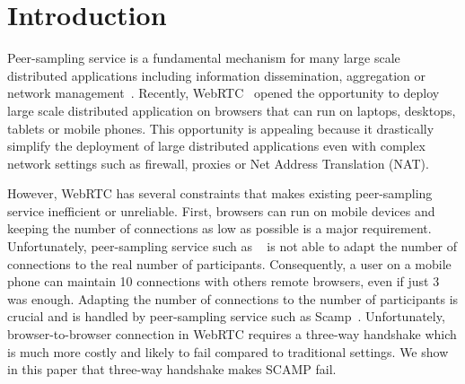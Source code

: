 
\section{Introduction}

Peer-sampling service is a fundamental mechanism for many large scale
distributed applications including information dissemination,
aggregation or network management~\cite{jelasity2007gossip}. Recently,
WebRTC~\cite{webrtc} opened the opportunity to deploy large scale
distributed application on browsers that can run on laptops, desktops,
tablets or mobile phones. This opportunity is appealing because it
drastically simplify the deployment of large distributed applications
even with complex network settings such as firewall, proxies or Net
Address Translation (NAT).


However, WebRTC has several constraints that makes existing
peer-sampling service inefficient or unreliable. First, browsers can
run on mobile devices and keeping the number of connections as low as
possible is a major requirement. Unfortunately, peer-sampling service
such as \CYCLON{}~\cite{ voulgaris2005cyclon} is not able to adapt the
number of connections to the real number of
participants. Consequently, a user on a mobile phone can maintain 10
connections with others remote browsers, even if just 3 was
enough. Adapting the number of connections to the number of
participants is crucial and is handled by peer-sampling service such
as Scamp~\cite{ganesh2003peer}. Unfortunately, browser-to-browser connection
in WebRTC requires a three-way handshake which is much more costly and
likely to fail compared to traditional settings. We show in this paper
that three-way handshake makes SCAMP fail. 


